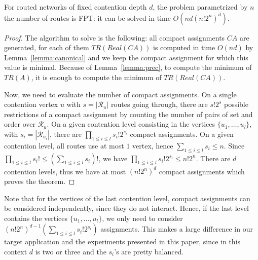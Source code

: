 
\begin{theorem}\label{theorem:FPT}
For routed networks of fixed contention depth $d$, the problem \spall parametrized by $n$ the number of routes is FPT: it can be solved in time $O(nd(n!2^{n})^{d})$.
\end{theorem}
\begin{proof}
The algorithm to solve \spall is the following: all compact assignments $CA$ are generated, for each of them $TR(Real(CA))$ is computed in time
$O(nd)$ by Lemma~\ref{lemma:canonical} and we keep the compact assignment for which this value is minimal.  Because of Lemma~\ref{lemma:prec}, to compute the minimum of $TR(A)$, it is enough 
to compute the minimum of $TR(Real(CA))$.

 Now, we need to evaluate the number of compact assignments. 
On a single contention vertex $u$ with $s = |\mathcal{R}_u|$ routes going through, there are $s!2^s$ possible restrictions of a compact assignment by counting the number of pairs of set and order over $\mathcal{R}_u$.
On a given contention level consisting in the vertices $\{u_1,\dots,u_l\}$, with $s_i = |\mathcal{R}_{u_{i}}|$, there are 
$\prod_{1 \leq i\leq l} s_i!2^{s_i}$ compact assignments. On a given contention level, all routes use at most $1$ vertex, hence $\sum_{1 \leq i\leq l} s_i \leq n$. Since $\prod_{1 \leq i\leq l} s_i! \leq (\sum_{1 \leq i\leq l} s_i)!$, we have $\prod_{1 \leq i\leq l} s_i!2^{s_i} \leq n!2^n$. There are $d$ contention levels, thus we have at most $ (n!2^{n})^{d}$ compact assignments which proves the theorem.
\end{proof}

Note that for the vertices of the last contention level, compact assignments can be considered independently, since
they do not interact. Hence, if the last level contains the vertices $\{u_1,\dots,u_l\}$, we only need to consider $(n!2^{n})^{d-1}(\sum_{1 \leq i\leq l} s_{i}!2^{s_i})$ assignments. This makes a large difference in our target application and the experiments presented in this paper, since in this context $d$ is two or three and the $s_i$'s are pretty balanced.



